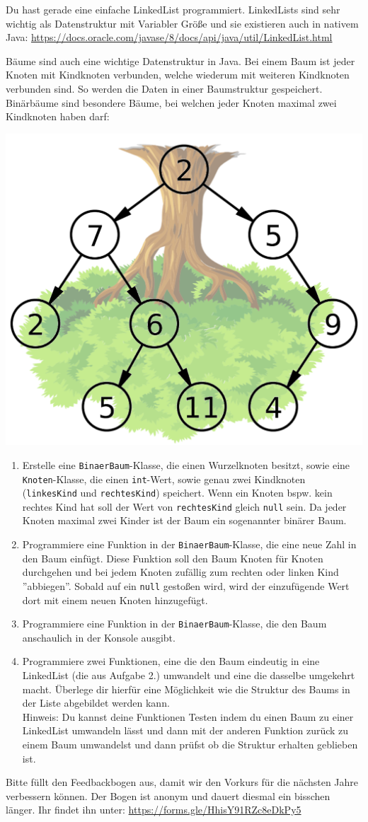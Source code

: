 \documentclass{../../sheet}
\begin{document}
Du hast gerade eine einfache LinkedList programmiert. LinkedLists sind sehr wichtig als Datenstruktur mit Variabler Größe und sie existieren auch in nativem Java: \url{https://docs.oracle.com/javase/8/docs/api/java/util/LinkedList.html}

\newpage
{}
Bäume sind auch eine wichtige Datenstruktur in Java. Bei einem Baum ist jeder Knoten mit Kindknoten verbunden, welche wiederum mit weiteren Kindknoten verbunden sind. So werden die Daten in einer Baumstruktur gespeichert. Binärbäume sind besondere Bäume, bei welchen jeder Knoten maximal zwei Kindknoten haben darf: 
\\
\begin{center}
    \includegraphics[width=0.5\linewidth]{img/baum.png}
\end{center}

\begin{enumerate}
    \item Erstelle eine \texttt{BinaerBaum}-Klasse, die einen Wurzelknoten besitzt, sowie eine \texttt{Knoten}-Klasse, die einen \texttt{int}-Wert, sowie genau zwei Kindknoten (\texttt{linkesKind} und \texttt{rechtesKind}) speichert. Wenn ein Knoten bspw. kein rechtes Kind hat soll der Wert von \texttt{rechtesKind} gleich \texttt{null} sein. Da jeder Knoten maximal zwei Kinder ist der Baum ein sogenannter binärer Baum.
    \item Programmiere eine Funktion in der \texttt{BinaerBaum}-Klasse, die eine neue Zahl in den Baum einfügt. Diese Funktion soll den Baum Knoten für Knoten durchgehen und bei jedem Knoten zufällig zum rechten oder linken Kind ''abbiegen''. Sobald auf ein \texttt{null} gestoßen wird, wird der einzufügende Wert dort mit einem neuen Knoten hinzugefügt.
    \item Programmiere eine Funktion in der \texttt{BinaerBaum}-Klasse, die den Baum anschaulich in der Konsole ausgibt.
    \item Programmiere zwei Funktionen, eine die den Baum eindeutig in eine LinkedList (die aus Aufgabe 2.) umwandelt und eine die dasselbe umgekehrt macht. Überlege dir hierfür eine Möglichkeit wie die Struktur des Baums in der Liste abgebildet werden kann.\\
    Hinweis: Du kannst deine Funktionen Testen indem du einen Baum zu einer LinkedList umwandeln lässt und dann mit der anderen Funktion zurück zu einem Baum umwandelst und dann prüfst ob die Struktur erhalten geblieben ist.
\end{enumerate}

Bitte füllt den Feedbackbogen aus, damit wir den Vorkurs für die nächsten Jahre verbessern können. Der Bogen ist anonym und dauert diesmal ein bisschen länger. \newline Ihr findet ihn unter: \url{https://forms.gle/HhisY91RZc8eDkPy5}
\end{document}
